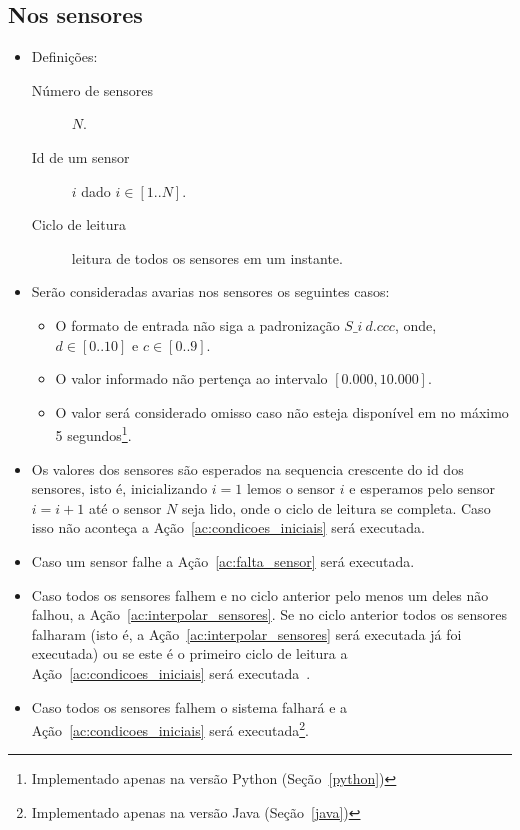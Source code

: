 \documentclass[a4paper,12pt]{article}
\begin{document}
\subsection{Nos sensores}\label{sec:av_sensor}
\begin{itemize}
	\item Definições:
		\begin{description}
			\item[Número de sensores] $N$.
			\item[Id de um sensor] $i$ dado $i\in[1..N]$.
			\item[Ciclo de leitura] leitura de todos os sensores em um instante.
		\end{description}
	\item Serão consideradas avarias nos sensores os seguintes casos:
	\begin{itemize}
		\item O formato de entrada não siga a padronização $S\_i~d.ccc$,
			onde, $d\in[0..10]$ e $c\in[0..9]$.
		\item O valor informado não pertença ao intervalo
			$[0.000,10.000]$.
		\item O valor será considerado omisso caso não esteja disponível em no máximo
			5 segundos\footnote{Implementado apenas na versão Python
			(Seção~\ref{python})\label{ft:python}}.
	\end{itemize}
	\item Os valores dos sensores são esperados na sequencia crescente do id
		dos sensores, isto é, inicializando $i=1$ lemos o sensor $i$ e esperamos
		pelo sensor $i=i+1$ até o sensor $N$ seja lido, onde o ciclo de leitura
		se completa.
		Caso isso não aconteça a Ação~\ref{ac:condicoes_iniciais} será
		executada.
	\item Caso um sensor falhe a Ação~\ref{ac:falta_sensor} será executada.
	\item Caso todos os sensores falhem e no ciclo anterior pelo menos um deles
		não falhou, a Ação~\ref{ac:interpolar_sensores}. Se no ciclo anterior
		todos os sensores falharam (isto é, a Ação~\ref{ac:interpolar_sensores}
		será executada já foi executada) ou se este é o primeiro ciclo de
		leitura a Ação~\ref{ac:condicoes_iniciais} será
		executada~.
	\item Caso todos os sensores falhem o sistema falhará e a
		Ação~\ref{ac:condicoes_iniciais} será executada\footnote{Implementado
		apenas na versão Java (Seção~\ref{java})\label{ft:java}}.
\end{itemize}
\end{document}
